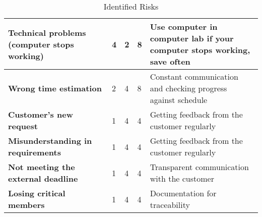 \begin{table}[H]
\begin{adjustbox}{width=1.2\textwidth}
\begin{tabular}{|l|l|l|l|l|}
\textbf{Technical problems (computer stops working)}      & 4                    & 2               & 8                                                                                                          & Use computer in computer lab if your computer stops working, save often                                 \\ \hline
\textbf{Wrong time estimation}                            & 2                    & 4               & 8                                                                                                          & Constant communication and checking progress against schedule                                           \\ \hline
\textbf{Customer’s new request}                           & 1                    & 4               & 4                                                                                                          & Getting feedback from the customer regularly                                                            \\ \hline
\textbf{Misunderstanding in requirements}                 & 1                    & 4               & 4                                                                                                          & Getting feedback from the customer regularly                                                            \\ \hline
\textbf{Not meeting the external deadline}                & 1                    & 4               & 4                                                                                                          & Transparent communication with the customer                                                             \\ \hline
\textbf{Losing critical members} & 1                    & 4               & 4                                                                                                          & Documentation for traceability    \\ \hline
\end{tabular}
\end{adjustbox}
\caption{Identified Risks}
\label{tab: risk}
\end{table}








